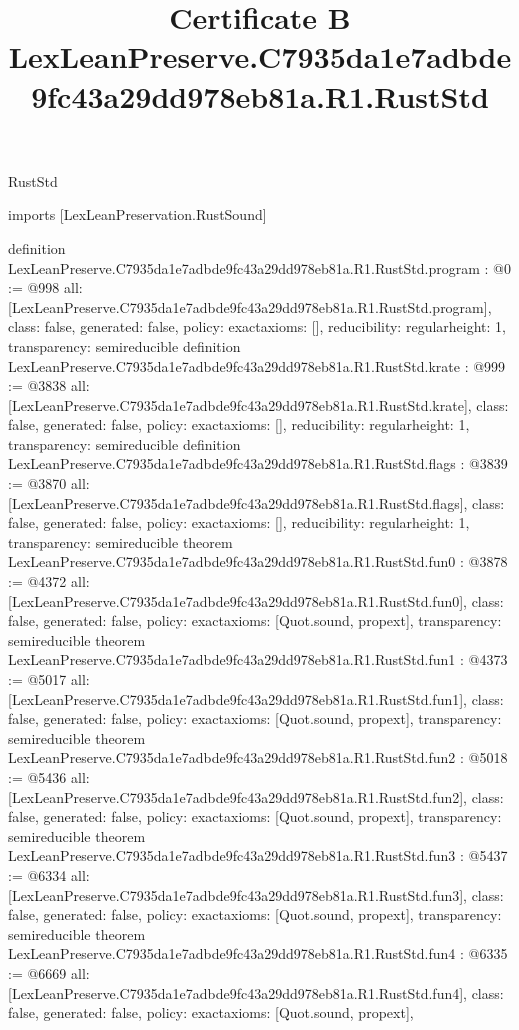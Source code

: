 \begin{lexlean}{RustStd}
\title{Certificate B LexLeanPreserve.C7935da1e7adbde9fc43a29dd978eb81a.R1.RustStd}
\begin{coremodule}
imports [LexLeanPreservation.RustSound]

definition LexLeanPreserve.C7935da1e7adbde9fc43a29dd978eb81a.R1.RustStd.program : @0 := @998 {
  all: [LexLeanPreserve.C7935da1e7adbde9fc43a29dd978eb81a.R1.RustStd.program],
  class: false,
  generated: false,
  policy: exact{axioms: []},
  reducibility: regular{height: 1},
  transparency: semireducible
}
definition LexLeanPreserve.C7935da1e7adbde9fc43a29dd978eb81a.R1.RustStd.krate : @999 := @3838 {
  all: [LexLeanPreserve.C7935da1e7adbde9fc43a29dd978eb81a.R1.RustStd.krate],
  class: false,
  generated: false,
  policy: exact{axioms: []},
  reducibility: regular{height: 1},
  transparency: semireducible
}
definition LexLeanPreserve.C7935da1e7adbde9fc43a29dd978eb81a.R1.RustStd.flags : @3839 := @3870 {
  all: [LexLeanPreserve.C7935da1e7adbde9fc43a29dd978eb81a.R1.RustStd.flags],
  class: false,
  generated: false,
  policy: exact{axioms: []},
  reducibility: regular{height: 1},
  transparency: semireducible
}
theorem LexLeanPreserve.C7935da1e7adbde9fc43a29dd978eb81a.R1.RustStd.fun0 : @3878 := @4372 {
  all: [LexLeanPreserve.C7935da1e7adbde9fc43a29dd978eb81a.R1.RustStd.fun0],
  class: false,
  generated: false,
  policy: exact{axioms: [Quot.sound, propext]},
  transparency: semireducible
}
theorem LexLeanPreserve.C7935da1e7adbde9fc43a29dd978eb81a.R1.RustStd.fun1 : @4373 := @5017 {
  all: [LexLeanPreserve.C7935da1e7adbde9fc43a29dd978eb81a.R1.RustStd.fun1],
  class: false,
  generated: false,
  policy: exact{axioms: [Quot.sound, propext]},
  transparency: semireducible
}
theorem LexLeanPreserve.C7935da1e7adbde9fc43a29dd978eb81a.R1.RustStd.fun2 : @5018 := @5436 {
  all: [LexLeanPreserve.C7935da1e7adbde9fc43a29dd978eb81a.R1.RustStd.fun2],
  class: false,
  generated: false,
  policy: exact{axioms: [Quot.sound, propext]},
  transparency: semireducible
}
theorem LexLeanPreserve.C7935da1e7adbde9fc43a29dd978eb81a.R1.RustStd.fun3 : @5437 := @6334 {
  all: [LexLeanPreserve.C7935da1e7adbde9fc43a29dd978eb81a.R1.RustStd.fun3],
  class: false,
  generated: false,
  policy: exact{axioms: [Quot.sound, propext]},
  transparency: semireducible
}
theorem LexLeanPreserve.C7935da1e7adbde9fc43a29dd978eb81a.R1.RustStd.fun4 : @6335 := @6669 {
  all: [LexLeanPreserve.C7935da1e7adbde9fc43a29dd978eb81a.R1.RustStd.fun4],
  class: false,
  generated: false,
  policy: exact{axioms: [Quot.sound, propext]},
}
\end{coremodule}
\end{lexlean}
